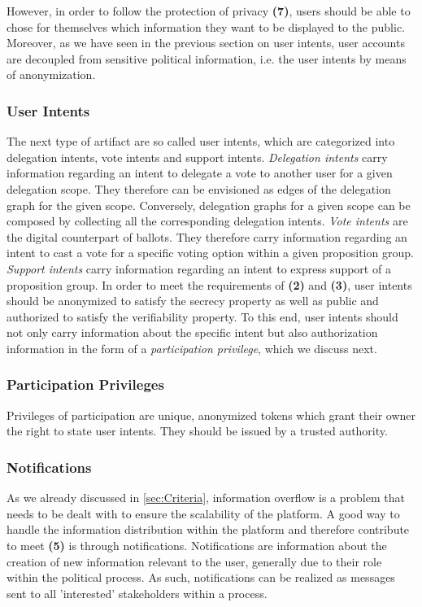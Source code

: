 However, in order to follow the protection of privacy \textbf{(7)}, users should be able to chose for themselves which information they want to be displayed to the public.
Moreover, as we have seen in the previous section on user intents, user accounts are decoupled from sensitive political information, i.e. the user intents by means of anonymization.

\subsubsection{User Intents}
\label{ssec:User_Intents}
The next type of artifact are so called user intents, which are categorized into delegation intents, vote intents and support intents.
\emph{Delegation intents} carry information regarding an intent to delegate a vote to another user for a given delegation scope.
They therefore can be envisioned as edges of the delegation graph for the given scope.
Conversely, delegation graphs for a given scope can be composed by collecting all the corresponding delegation intents.
\emph{Vote intents} are the digital counterpart of ballots.
They therefore carry information regarding an intent to cast a vote for a specific voting option within a given proposition group.
\emph{Support intents} carry information regarding an intent to express support of a proposition group.
In order to meet the requirements of \textbf{(2)} and \textbf{(3)}, user intents should be anonymized to satisfy the secrecy property as well as public and authorized to satisfy the verifiability property.
To this end, user intents should not only carry information about the specific intent but also authorization information in the form of a \textit{participation privilege}, which we discuss next.

\subsubsection{Participation Privileges}
\label{ssec:Participation_Privileges}
Privileges of participation are unique, anonymized tokens which grant their owner the right to state user intents.
They should be issued by a trusted authority.

\subsubsection{Notifications}
\label{sec:Notifications}
As we already discussed in \ref{sec:Criteria}, information overflow is a problem that needs to be dealt with to ensure the scalability of the platform.
A good way to handle the information distribution within the platform and therefore contribute to meet \textbf{(5)} is through notifications.
Notifications are information about the creation of new information relevant to the user, generally due to their role within the political process.
As such, notifications can be realized as messages sent to all 'interested' stakeholders within a process.

